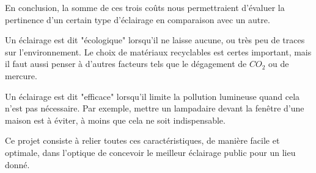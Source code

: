 En conclusion, la somme de ces trois co\^uts nous permettraient d'\'evaluer la pertinence d'un certain type d'\'eclairage en comparaison avec un autre.

Un \'eclairage est dit "\'ecologique" lorsqu'il ne laisse aucune, ou tr\`es peu de traces sur l'environnement. Le choix de mat\'eriaux  recyclables est certes important, mais il faut aussi penser \`a d'autres facteurs tels que le d\'egagement de $CO_2$ ou de mercure.

Un \'eclairage est dit "efficace" lorsqu'il limite la pollution lumineuse quand cela n'est pas n\'ecessaire. Par exemple, mettre un lampadaire devant la fen\^etre d'une maison est \`a \'eviter, à moins que cela ne soit indispensable.

Ce projet consiste \`a relier toutes ces caract\'eristiques, de manière facile et optimale, dans l'optique de concevoir le meilleur \'eclairage public pour un lieu donn\'e.